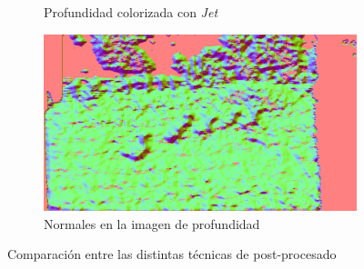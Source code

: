 \documentclass[12pt,a4paper]{report}
\begin{document}
\begin{figure}
\begin{subfigure}{0.45\textwidth}
        \caption{Profundidad colorizada con \textit{Jet}}
        \label{fig:jet-colorization}
    \end{subfigure}
    \hfill
    \begin{subfigure}{0.45\textwidth}
        \centering
        \includegraphics[width=\textwidth]{media/data/normal_gueese.png}
        \caption{Normales en la imagen de profundidad}
        \label{fig:normals-colorization}
    \end{subfigure}
    \caption{Comparación entre las distintas técnicas de post-procesado}
    \label{fig:preprocessing-comparison}
\end{figure}

\end{document}
